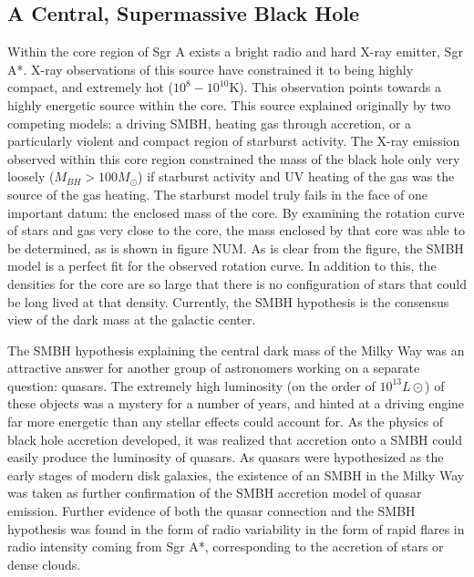\documentclass[12pt]{article}
\begin{document}
\subsection{A Central, Supermassive Black Hole}
Within the core region of Sgr A exists a bright radio and hard X-ray emitter, 
Sgr A*.  X-ray observations of this source have constrained it to being highly
compact, and extremely hot ($10^8-10^{10}$K).  This observation points towards
a highly energetic source within the core.  This source explained originally by
two competing models: a driving SMBH, heating gas through accretion, or a 
particularly violent and compact region of starburst activity.  The X-ray 
emission observed within this core region constrained the mass of the black hole
only very loosely ($M_{BH} > 100 M_\odot$) if starburst activity and UV heating
of the gas was the source of the gas heating.  The starburst model truly fails
in the face of one important datum:  the enclosed mass of the core.  By 
examining the rotation curve of stars and gas very close to the core, the 
mass enclosed by that core was able to be determined, as is shown in figure NUM.
As is clear from the figure, the SMBH model is a perfect fit for the observed 
rotation curve.  In addition to this, the densities for the core are so large
that there is no configuration of stars that could be long lived at that 
density.  Currently, the SMBH hypothesis is the consensus view of the dark mass
at the galactic center.

The SMBH hypothesis explaining the central dark mass of the Milky Way was an
attractive answer for another group of astronomers working on a separate 
question:  quasars.  The extremely high luminosity (on the order of 
$10^{13}L\odot$) of these objects was a
mystery for a number of years, and hinted at a driving engine far more energetic
than any stellar effects could account for.  As the physics of black hole
accretion developed, it was realized that accretion onto a SMBH could easily 
produce the luminosity of quasars.  As quasars were hypothesized as the early
stages of modern disk galaxies, the existence of an SMBH in the Milky Way was
taken as further confirmation of the SMBH accretion model of quasar emission.
Further evidence of both the quasar connection and the SMBH hypothesis was found
in the form of radio variability in the form of rapid flares in radio intensity
coming from Sgr A*, corresponding to the accretion of stars or dense clouds.
\end{document}
